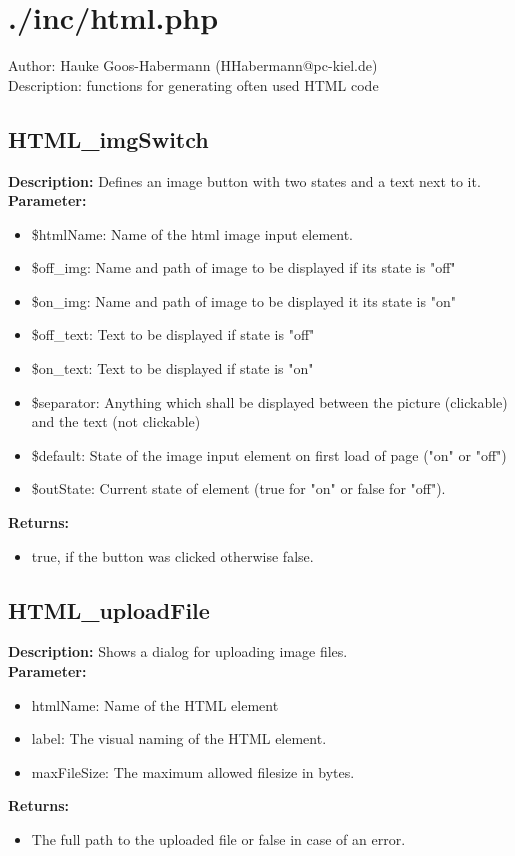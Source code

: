 \newpage\section{./inc/html.php}
 Author: Hauke Goos-Habermann (HHabermann@pc-kiel.de)\\
 Description: functions for generating often used HTML code\\

\subsection{HTML\_imgSwitch}
\textbf{Description:} Defines an image button with two states and a text next to it.\\
\textbf{Parameter:}
\begin{itemize}
\item \$htmlName: Name of the html image input element.
\item \$off\_img: Name and path of image to be displayed if its state is "off"
\item \$on\_img: Name and path of image to be displayed it its state is "on"
\item \$off\_text: Text to be displayed if state is "off"
\item \$on\_text: Text to be displayed if state is "on"
\item \$separator: Anything which shall be displayed between the picture (clickable) and the text (not clickable)
\item \$default: State of the image input element on first load of page ("on" or "off")
\item \$outState: Current state of element (true for "on" or false for "off").
\end{itemize}
\textbf{Returns:}
\begin{itemize}
\item true, if the button was clicked otherwise false.
\end{itemize}

\subsection{HTML\_uploadFile}
\textbf{Description:} Shows a dialog for uploading image files.\\
\textbf{Parameter:}
\begin{itemize}
\item htmlName: Name of the HTML element
\item label: The visual naming of the HTML element.
\item maxFileSize: The maximum allowed filesize in bytes.
\end{itemize}
\textbf{Returns:}
\begin{itemize}
\item The full path to the uploaded file or false in case of an error.
\end{itemize}

